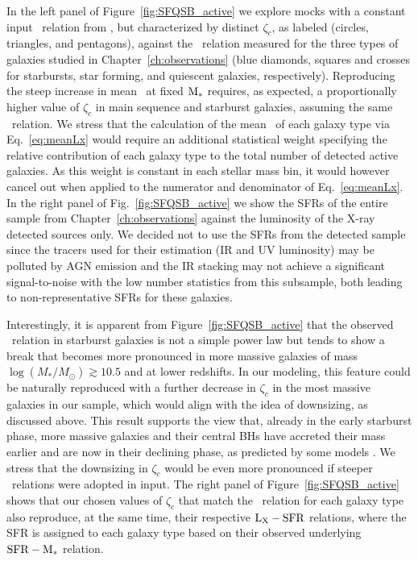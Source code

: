 In the left panel of Figure~\ref{fig:SFQSB_active} we explore mocks with a constant input
\MBHMS\ relation from \citet{2015ApJ...813...82R}, but characterized by distinct $\zeta_c$, as labeled (circles, triangles, and pentagons), against the \LXMS\ relation measured for the three types of galaxies studied in Chapter~\ref{ch:observations} (blue diamonds, squares and crosses for starbursts, star forming, and quiescent galaxies, respectively). Reproducing the steep increase in mean \LX\ at fixed ${\rm M}_*$ requires, as expected, a proportionally higher value of $\zeta_c$ in main sequence and starburst galaxies, assuming the same \MBHMS\ relation. We stress that the calculation of the mean \LX\ of each galaxy type via Eq.~\ref{eq:meanLx} would require an additional statistical weight specifying the relative contribution of each galaxy type to the total number of detected active galaxies. As this weight is constant in each stellar mass bin, it would however cancel out when applied to the numerator and denominator of Eq.~\ref{eq:meanLx}.
In the right panel of Fig.~\ref{fig:SFQSB_active} we show the SFRs of the entire sample from Chapter~\ref{ch:observations} against the luminosity of the X-ray detected sources only. We decided not to use the SFRs from the detected sample since the tracers used for their estimation (IR and UV luminosity) may be polluted by AGN emission and the IR stacking may not achieve a significant signal-to-noise with the low number statistics from this subsample, both leading to non-representative SFRs for these galaxies.

Interestingly, it is apparent from Figure~\ref{fig:SFQSB_active} that the observed \LXMS\
relation in starburst galaxies is not a simple power law but tends to show a break
that becomes more pronounced in more massive galaxies of mass
$\log (M_*/M_{\odot}) \gtrsim 10.5$ and at lower redshifts. In our modeling,
this feature could be naturally reproduced with a further decrease in $\zeta_c$ in the
most massive galaxies in our sample, which would align with the idea of downsizing, as
discussed above. This result supports the view that, already in the early starburst phase,
more massive galaxies and their central BHs have accreted their mass earlier and are
now in their declining phase, as predicted by some models \citep[e.g.,][]{2018ApJ...857...22L}. We stress
that the downsizing in $\zeta_c$ would be even more pronounced if steeper \MBHMS\ relations
were adopted in input. The right panel of Figure~\ref{fig:SFQSB_active} shows that our
chosen values of $\zeta_c$ that match the \LXMS\ relation for each galaxy type also
reproduce, at the same time, their respective ${\rm L}_{\rm X}-{\rm SFR}$ relations, where
the SFR is assigned to each galaxy type based on their observed underlying
${\rm SFR}-{\rm M}_*$ relation. 

